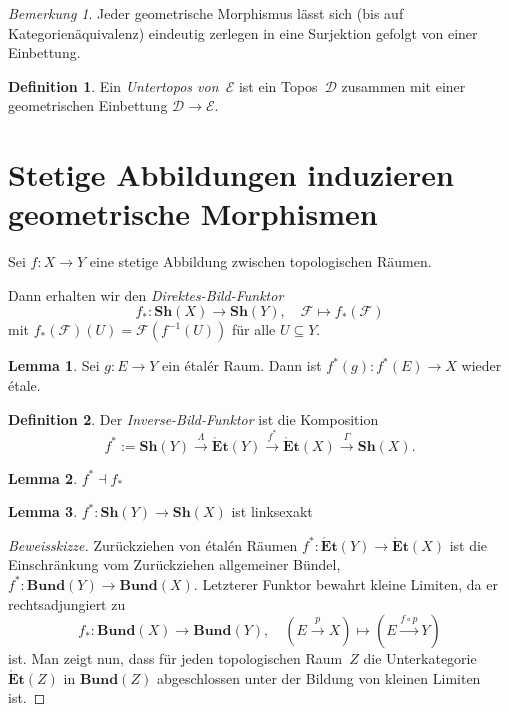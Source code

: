 \documentclass{article}
\theoremstyle{definition}
\newtheorem*{defn}{Definition}
\newtheorem*{lem}{Lemma}
\theoremstyle{remark}
\newtheorem*{bem}{Bemerkung}
\newcommand{\coloneqq}{:=} %
\newcommand{\?}{\,{:}\,}
\renewcommand{\_}{\mathpunct{.}\,}
\newcommand{\ladj}{\dashv} %
\newcommand{\Sh}{\mathbf{Sh}} %
\newcommand{\Etale}{\mathbf{\acute{E}t}} %
\newcommand{\Bund}{\mathbf{Bund}} %
\newcommand{\Dat}{\mathcal{D}} %
\newcommand{\Eat}{\mathcal{E}} %
\newcommand{\Fais}{\mathcal{F}} %
\begin{document}
\begin{bem}
  Jeder geometrische Morphismus lässt sich (bis auf Kategorienäquivalenz) eindeutig zerlegen in eine Surjektion gefolgt von einer Einbettung.
\end{bem}

\begin{defn}
  Ein \emph{Untertopos von~$\Eat$} ist ein Topos~$\Dat$ zusammen mit einer geometrischen Einbettung $\Dat \to \Eat$.
\end{defn}

\section{Stetige Abbildungen induzieren geometrische Morphismen}

Sei $f : X \to Y$ eine stetige Abbildung zwischen topologischen Räumen.

Dann erhalten wir den \emph{Direktes-Bild-Funktor}
\[
  f_* : \Sh(X) \to \Sh(Y), \quad
  \Fais \mapsto f_*(\Fais)
\]
mit $f_*(\Fais)(U) = \Fais(f^{-1}(U))$ für alle $U \subseteq Y$.

\begin{lem}
  Sei $g : E \to Y$ ein étalér Raum.
  Dann ist $f^*(g) : f^*(E) \to X$ wieder étale.
\end{lem}

\begin{defn}
  Der \emph{Inverse-Bild-Funktor} ist die Komposition
  \[
    f^* \coloneqq \Sh(Y) \xrightarrow{\Lambda} \Etale(Y) \xrightarrow{f^*} \Etale(X) \xrightarrow{\Gamma} \Sh(X).
  \]
\end{defn}

\begin{lem}
  $f^* \ladj f_*$  
\end{lem}

\begin{lem}
  $f^* : \Sh(Y) \to \Sh(X)$ ist linksexakt
\end{lem}

\begin{proof}[Beweisskizze]
  Zurückziehen von étalén Räumen $f^* : \Etale(Y) \to \Etale(X)$ ist die Einschränkung vom Zurückziehen allgemeiner Bündel, $f^* : \Bund(Y) \to \Bund(X)$.
  Letzterer Funktor bewahrt kleine Limiten, da er rechtsadjungiert zu
  \[
    f_* : \Bund(X) \to \Bund(Y), \quad
    (E \xrightarrow{p} X) \mapsto (E \xrightarrow{f \circ p} Y)
  \]
  ist.
  Man zeigt nun, dass für jeden topologischen Raum~$Z$ die Unterkategorie $\Etale(Z)$ in $\Bund(Z)$ abgeschlossen unter der Bildung von kleinen Limiten ist.
\end{proof}
\end{document}
